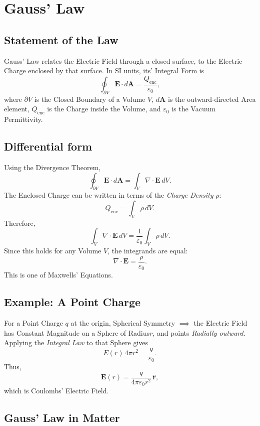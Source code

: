 \documentclass[a4paper, 10pt, onepage]{elegantbook}
\begin{document}
{\section{Gauss' Law}

\subsection{Statement of the Law}

Gauss' Law relates the Electric Field through a closed surface, to the Electric Charge enclosed by 
that surface. In SI units, its' Integral Form is
\[
\boxed{
\oint_{\partial V}\mathbf{E}\cdot d\mathbf{A}
=\frac{Q_{\mathrm{enc}}}{\varepsilon_0}
},
\]
where \(\partial V\) is the Closed Boundary of a Volume \(V\),
\(d\mathbf{A}\) is the outward-directed Area element,
\(Q_{\mathrm{enc}}\) is the Charge inside the Volume, and
\(\varepsilon_0\) is the Vacuum Permittivity.

\subsection{Differential form}

Using the Divergence Theorem,
\[
\oint_{\partial V}\mathbf{E}\cdot d\mathbf{A}
=\int_V \nabla\cdot\mathbf{E}\,dV.
\]
The Enclosed Charge can be written in terms of the \emph{Charge Density}
\(\rho\):
\[
Q_{\mathrm{enc}}=\int_V\rho\,dV.
\]
Therefore,
\[
\int_V \nabla\cdot\mathbf{E}\,dV
=\frac{1}{\varepsilon_0}\int_V\rho\,dV.
\]
Since this holds for any Volume \(V\), the integrands are equal:
\[
\boxed{
\nabla\cdot\mathbf{E}=\frac{\rho}{\varepsilon_0}
}.
\]
This is one of Maxwells' Equations.

\subsection{Example: A Point Charge}

For a Point Charge \(q\) at the origin, Spherical Symmetry $\implies$ the Electric Field has Constant Magnitude on a 
Sphere of Radius\(r\), and points \emph{Radially outward}. Applying the \emph{Integral Law} to that Sphere gives
\[
E(r)\,4\pi r^2=\frac{q}{\varepsilon_0}.
\]
Thus,
\[
\mathbf{E}(r)
=\frac{q}{4\pi\varepsilon_0 r^2}\,\hat{\mathbf{r}},
\]
which is Coulombs' Electric Field.

\subsection{Gauss' Law in Matter}

}
\end{document}
